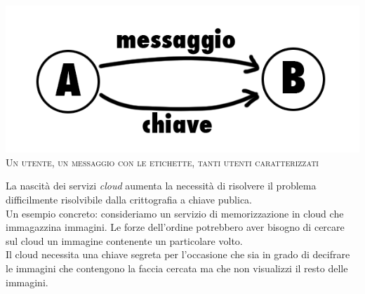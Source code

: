 \begin{center}
\begin{minipage}[c]{0.9\textwidth}
		\centering
		\includegraphics[keepaspectratio,width=\textwidth]{pairing.png}\\
		{\small\scshape Un utente, un messaggio con le etichette, tanti utenti caratterizzati}
\end{minipage}
\end{center}

\vspace{0.3cm}

La nascità dei servizi \emph{cloud} aumenta la necessità di risolvere il problema difficilmente risolvibile dalla crittografia a chiave publica.\\
Un esempio concreto: consideriamo un servizio di memorizzazione in cloud che immagazzina immagini. Le forze dell'ordine potrebbero aver bisogno di cercare sul cloud un immagine contenente un particolare volto.\\
Il cloud necessita una chiave segreta per l'occasione che sia in grado di decifrare le immagini che contengono la faccia cercata ma che non visualizzi il resto delle immagini.\\[0.2cm]

